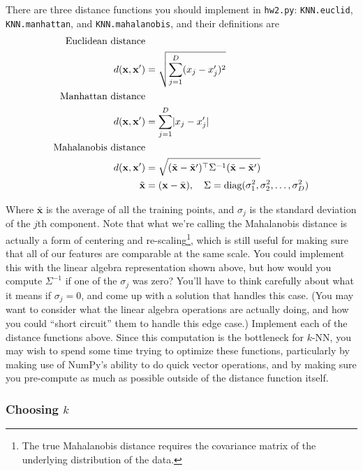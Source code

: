 \documentclass{article}
\begin{document}
There are three distance functions you should implement in \texttt{hw2.py}: \texttt{KNN.euclid}, \texttt{KNN.manhattan}, and \texttt{KNN.mahalanobis}, and their definitions are
\begin{align}
	\text{Euclidean distance}&\notag\\
	d(\mathbf{x},\mathbf{x}^\prime) &= \sqrt{\sum_{j=1}^D (x_j-x^\prime_j)^2}\\
	\text{Manhattan distance}&\notag\\
	d(\mathbf{x},\mathbf{x}^\prime) &= \sum_{j=1}^D \lvert x_j-x^\prime_j \rvert\\
	\text{Mahalanobis distance}&\notag\\
	d(\mathbf{x},\mathbf{x}^\prime) &= \sqrt{ (\tilde{\mathbf{x}} - \tilde{\mathbf{x}}^\prime)^\top \Sigma^{-1} (\tilde{\mathbf{x}} - \tilde{\mathbf{x}}^\prime) }\\
	\tilde{\mathbf{x}} &= (\mathbf{x}-\bar{\mathbf{x}}), ~~~\Sigma = \text{diag}(\sigma_1^2,\sigma_2^2,\ldots,\sigma_D^2)\notag
\end{align}

Where \(\bar{\mathbf{x}}\) is the average of all the training points, and \(\sigma_j\) is the standard deviation of the \(j\)th component. Note that what we're calling the Mahalanobis distance is actually a form of centering and re-scaling\footnote{The true Mahalanobis distance requires the covariance matrix of the underlying distribution of the data.}, which is still useful for making sure that all of our features are comparable at the same scale. You could implement this with the linear algebra representation shown above, but how would you compute \(\Sigma^{-1}\) if one of the \(\sigma_j\) was zero? You'll have to think carefully about what it means if \(\sigma_j=0\), and come up with a solution that handles this case. (You may want to consider what the linear algebra operations are actually doing, and how you could ``short circuit'' them to handle this edge case.) Implement each of the distance functions above. Since this computation is the bottleneck for \(k\)-NN, you may wish to spend some time trying to optimize these functions, particularly by making use of NumPy's ability to do quick vector operations, and by making sure you pre-compute as much as possible outside of the distance function itself.

\subsubsection*{Choosing \(k\)}
\end{document}

